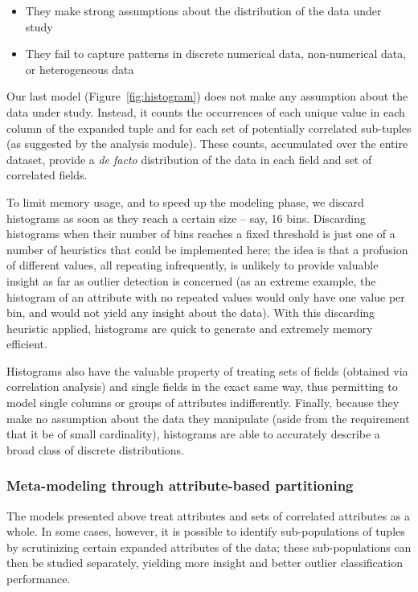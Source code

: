 \begin{itemize}
\item They make strong assumptions about the distribution of the data under study
\item They fail to capture patterns in discrete numerical data, non-numerical data, or heterogeneous data
\end{itemize}

Our last model (Figure~\ref{fig:histogram}) does not make any assumption about the data under study. Instead, it counts the occurrences of each unique value in each column of the expanded tuple and for each set of potentially correlated sub-tuples (as suggested by the analysis module). These counts, accumulated over the entire dataset, provide a \emph{de facto} distribution of the data in each field and set of correlated fields.

To limit memory usage, and to speed up the modeling phase, we discard histograms as soon as they reach a certain size -- say, 16 bins. Discarding histograms when their number of bins reaches a fixed threshold is just one of a number of heuristics that could be implemented here; the idea is that a profusion of different values, all repeating infrequently, is unlikely to provide valuable insight as far as outlier detection is concerned (as an extreme example, the histogram of an attribute with no repeated values would only have one value per bin, and would not yield any insight about the data). With this discarding heuristic applied, histograms are quick to generate and extremely memory efficient.

Histograms also have the valuable property of treating sets of fields (obtained via correlation analysis) and single fields in the exact same way, thus permitting to model single columns or groups of attributes indifferently. Finally, because they make no assumption about the data they manipulate (aside from the requirement that it be of small cardinality), histograms are able to accurately describe a broad class of discrete distributions.

\subsubsection{Meta-modeling through attribute-based partitioning}
\label{sec:partitioning}

The models presented above treat attributes and sets of correlated attributes as a whole. In some cases, however, it is possible to identify sub-populations of tuples by scrutinizing certain expanded attributes of the data; these sub-populations can then be studied separately, yielding more insight and better outlier classification performance.

